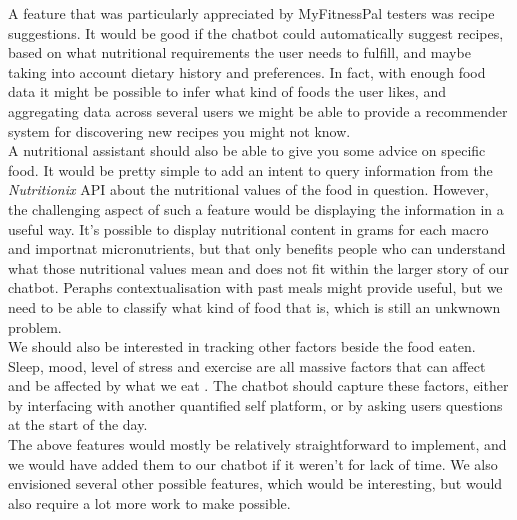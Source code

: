 A feature that was particularly appreciated by MyFitnessPal testers was recipe suggestions. It would be good if the chatbot could automatically suggest recipes, based on what nutritional requirements the user needs to fulfill, and maybe taking into account dietary history and preferences. In fact, with enough food data it might be possible to infer what kind of foods the user likes, and aggregating data across several users we might be able to provide a recommender system for discovering new recipes you might not know. \\
A nutritional assistant should also be able to give you some advice on specific food. It would be pretty simple to add an intent to query information from the \textit{Nutritionix} API about the nutritional values of the food in question. However, the challenging aspect of such a feature would be displaying the information in a useful way. It's possible to display nutritional content in grams for each macro and importnat micronutrients, but that only benefits people who can understand what those nutritional values mean and does not fit within the larger story of our chatbot. Peraphs contextualisation with past meals might provide useful, but we need to be able to classify what kind of food that is, which is still an unkwnown problem.\\
We should also be interested in tracking other factors beside the food eaten. Sleep, mood, level of stress and exercise are all massive factors that can affect and be affected by what we eat \cite{}. The chatbot should capture these factors, either by interfacing with another quantified self platform, or by asking users questions at the start of the day. \\
The above features would mostly be relatively straightforward to implement, and we would have added them to our chatbot if it weren't for lack of time. We also envisioned several other possible features, which would be interesting, but would also require a lot more work to make possible. \\
